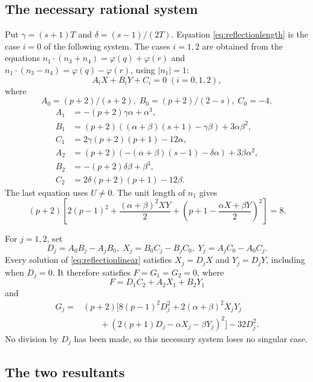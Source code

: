 \documentclass[11pt]{article}
\theoremstyle{definition}
\theoremstyle{remark}
\newcommand{\ph}{\varphi}
\begin{document}
\begin{appendices}
\subsection{The necessary rational system}

Put $\gamma=(s+1)T$ and $\delta=(s-1)/(2T)$. Equation \eqref{eq:reflectionlength} is the case $i=0$ of the following system. The cases $i=1,2$ are obtained from the equations $n_1\cdot(n_3+n_4)=\ph(q)+\ph(r)$ and $n_1\cdot(n_3-n_4)=\ph(q)-\ph(r)$, using $|n_1|=1$:
\begin{equation}
A_iX+B_iY+C_i=0\;(i=0,1,2),
\label{eq:reflectionlinear}
\end{equation}
where
\[
A_0=(p+2)/(s+2),\; B_0=(p+2)/(2-s),\; C_0=-4,
\]
\begin{align*}
A_1&=-(p+2)\gamma\alpha+\alpha^3,\\
B_1&=(p+2)((\alpha+\beta)(s+1)-\gamma\beta)+3\alpha\beta^2,\\
C_1&=2\gamma(p+2)(p+1)-12\alpha,\\
A_2&=(p+2)(-(\alpha+\beta)(s-1)-\delta\alpha)+3\beta\alpha^2,\\
B_2&=-(p+2)\delta\beta+\beta^3,\\
C_2&=2\delta(p+2)(p+1)-12\beta.
\end{align*}
The last equation uses $U\ne0$. The unit length of $n_1$ gives
\begin{equation}
(p+2)\left[2(p-1)^2+\frac{(\alpha+\beta)^2XY}{2}
+\left(p+1-\frac{\alpha X+\beta Y}{2}\right)^2\right]=8.
\label{eq:reflectionunit}
\end{equation}

For $j=1,2$, set
\[
D_j=A_0B_j-A_jB_0,\;
X_j=B_0C_j-B_jC_0,\;
Y_j=A_jC_0-A_0C_j.
\]
Every solution of \eqref{eq:reflectionlinear} satisfies $X_j=D_jX$ and $Y_j=D_jY$, including when $D_j=0$. It therefore satisfies $F=G_1=G_2=0$, where
\[
F=D_1C_2+A_2X_1+B_2Y_1
\]
and
\begin{align*}
G_j={}&(p+2)\bigl[8(p-1)^2D_j^2+2(\alpha+\beta)^2X_jY_j\\
&\hspace{2em}+(2(p+1)D_j-\alpha X_j-\beta Y_j)^2\bigr]-32D_j^2.
\end{align*}
No division by $D_j$ has been made, so this necessary system loses no singular case.

\subsection{The two resultants}


\end{appendices}
\end{document}
